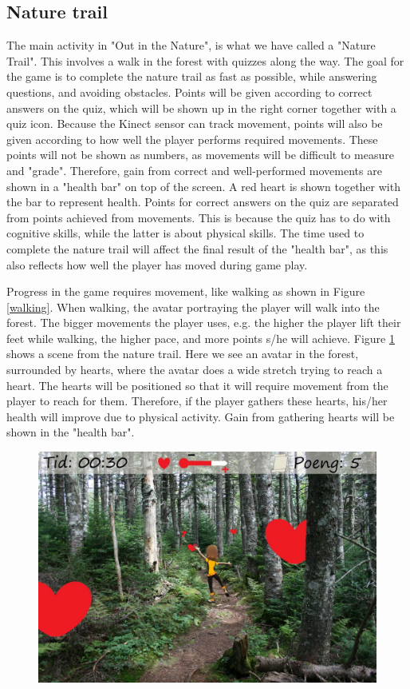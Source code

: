 \subsection{Nature trail}
The main activity in "Out in the Nature", is what we have called a "Nature Trail". This involves a walk in the forest with quizzes along the way. The goal for the game is to complete the nature trail as fast as possible, while answering questions, and avoiding obstacles. Points will be given according to correct answers on the quiz, which will be shown up in the right corner together with a quiz icon. Because the Kinect sensor can track movement, points will also be given according to how well the player performs required movements. These points will not be shown as numbers, as movements will be difficult to measure and "grade". Therefore, gain from correct and well-performed movements are shown in a "health bar" on top of the screen. A red heart is shown together with the bar to represent health. Points for correct answers on the quiz are separated from points achieved from movements. This is because the quiz has to do with cognitive skills, while the latter is about physical skills. The time used to complete the nature trail will affect the final result of the "health bar", as this also reflects how well the player has moved during game play.   

Progress in the game requires movement, like walking as shown in Figure \ref{walking}. When walking, the avatar portraying the player will walk into the forest. The bigger movements the player uses, e.g. the higher the player lift their feet while walking, the higher pace, and more points s/he will achieve. Figure \ref{fig:hearts} shows a scene from the nature trail. Here we see an avatar in the forest, surrounded by hearts, where the avatar does a wide stretch trying to reach a heart. The hearts will be positioned so that it will require movement from the player to reach for them. Therefore, if the player gathers these hearts, his/her health will improve due to physical activity. Gain from gathering hearts will be shown in the "health bar".   

\begin{figure} [H]
\centering
\includegraphics[scale=0.5]{hjerter.jpg}
\caption[Nature trail - stretching]{}
\label{fig:hearts}
\end{figure}


